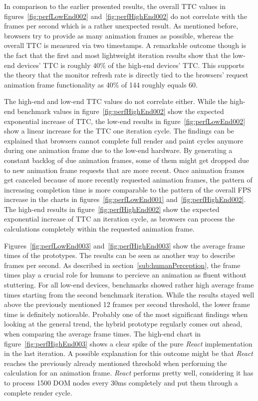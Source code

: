 In comparison to the earlier presented results, the overall TTC values in figures~\ref{fig:perfLowEnd002} and~\ref{fig:perfHighEnd002} do not correlate with the frames per second which is a rather unexpected result. As mentioned before, browsers try to provide as many animation frames as possible, whereas the overall TTC is measured via two timestamps. A remarkable outcome though is the fact that the first and most lightweight iteration results show that the low-end devices' TTC is roughly 40\% of the high-end devices' TTC. This supports the theory that the monitor refresh rate is directly tied to the browsers' request animation frame functionality as 40\% of 144 roughly equals 60. 

The high-end and low-end TTC values do not correlate either. While the high-end benchmark values in figure~\ref{fig:perfHighEnd002} show the expected exponential increase of TTC, the low-end results in figure~\ref{fig:perfLowEnd002} show a linear increase for the TTC one iteration cycle. The findings can be explained that browsers cannot complete full render and paint cycles anymore during one animation frame due to the low-end hardware. By generating a constant backlog of due animation frames, some of them might get dropped due to new animation frame requests that are more recent. Once animation frames get canceled because of more recently requested animation frames, the pattern of increasing completion time is more comparable to the pattern of the overall FPS increase in the charts in figures~\ref{fig:perfLowEnd001} and~\ref{fig:perfHighEnd002}. The high-end results in figure~\ref{fig:perfHighEnd002} show the expected exponential increase of TTC an iteration cycle, as browsers can process the calculations completely within the requested animation frame.

Figures~\ref{fig:perfLowEnd003} and~\ref{fig:perfHighEnd003} show the average frame times of the prototypes. The results can be seen as another way to describe frames per second. As described in section~\ref{sub:humanPerception}, the frame times play a crucial role for humans to percieve an animation as fluent without stuttering. For all low-end devices, benchmarks showed rather high average frame times starting from the second benchmark iteration. While the results stayed well above the previously mentioned 12 frames per second threshold, the lower frame time is definitely noticeable. Probably one of the most significant findings when looking at the general trend, the hybrid prototype regularly comes out ahead, when comparing the average frame times. The high-end chart in figure~\ref{fig:perfHighEnd003} shows a clear spike of the pure \emph{React} implementation in the last iteration. A possible explanation for this outcome might be that \emph{React} reaches the previously already mentioned threshold when performing the calculation for an animation frame. \emph{React} performs pretty well, considering it has to process 1500 DOM nodes every 30ms completely and put them through a complete render cycle.

